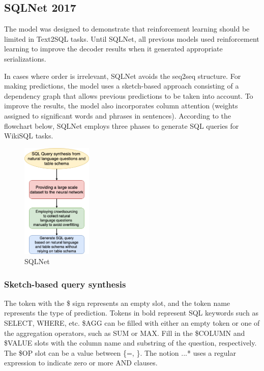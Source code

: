 \subsection{SQLNet 2017}

The model was designed to demonstrate that reinforcement learning should be limited in Text2SQL tasks.
Until SQLNet\cite{xu_sqlnet_2017}, all previous models used reinforcement learning to improve the decoder results when it generated appropriate serializations.


In cases where order is irrelevant, SQLNet avoids the seq2seq structure.
For making predictions, the model uses a sketch-based approach consisting of a dependency graph that allows previous predictions to be taken into account.
To improve the results, the model also incorporates column attention (weights assigned to significant words and phrases in sentences). According to the flowchart below, SQLNet employs three phases to generate SQL queries for WikiSQL tasks.

\begin{figure}[htb]
    \centering
    \includegraphics[width=0.3\textwidth]{pics/sqlnet/sqlnet.png}
    \caption{SQLNet}
    \label{fig:sqlnet}
\end{figure}

\subsubsection{Sketch-based query synthesis}

The token with the \$ sign represents an empty slot, and the token name represents the type of prediction. Tokens in bold represent SQL keywords such as SELECT, WHERE, etc.
\$AGG can be filled with either an empty token or one of the aggregation operators, such as SUM or MAX. Fill in the \$COLUMN and \$VALUE slots with the column name and substring of the question, respectively. The \$OP slot can be a value between \{=, \}. The notion \(...\)* uses a regular expression to indicate zero or more AND clauses.


